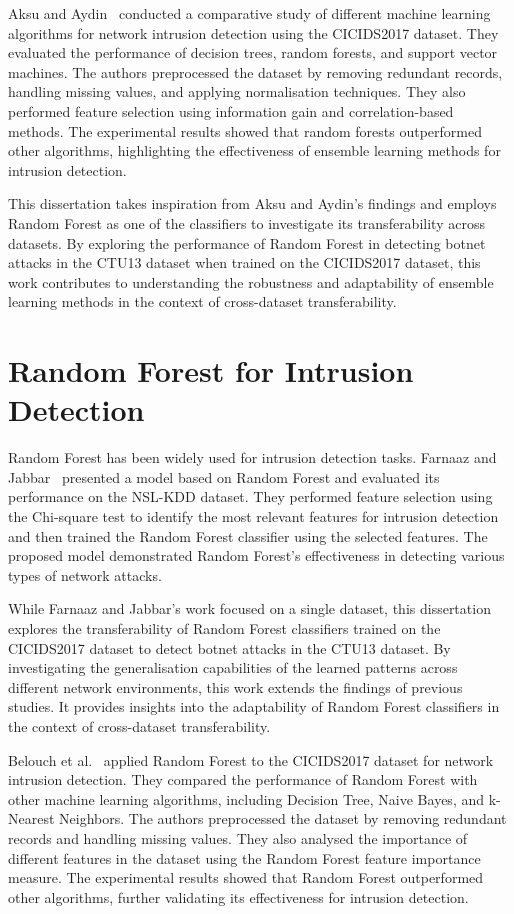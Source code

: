 Aksu and Aydin~\cite{aksu2018detecting} conducted a comparative study of different machine learning algorithms for network intrusion detection using the CICIDS2017 dataset. They evaluated the performance of decision trees, random forests, and support vector machines. The authors preprocessed the dataset by removing redundant records, handling missing values, and applying normalisation techniques. They also performed feature selection using information gain and correlation-based methods. The experimental results showed that random forests outperformed other algorithms, highlighting the effectiveness of ensemble learning methods for intrusion detection.

This dissertation takes inspiration from Aksu and Aydin’s findings and employs Random Forest as one of the classifiers to investigate its transferability across datasets. By exploring the performance of Random Forest in detecting botnet attacks in the CTU13 dataset when trained on the CICIDS2017 dataset, this work contributes to understanding the robustness and adaptability of ensemble learning methods in the context of cross-dataset transferability.

\section{Random Forest for Intrusion Detection}

Random Forest has been widely used for intrusion detection tasks. Farnaaz and Jabbar~\cite{farnaaz2016random} presented a model based on Random Forest and evaluated its performance on the NSL-KDD dataset. They performed feature selection using the Chi-square test to identify the most relevant features for intrusion detection and then trained the Random Forest classifier using the selected features. The proposed model demonstrated Random Forest’s effectiveness in detecting various types of network attacks.

While Farnaaz and Jabbar’s work focused on a single dataset, this dissertation explores the transferability of Random Forest classifiers trained on the CICIDS2017 dataset to detect botnet attacks in the CTU13 dataset. By investigating the generalisation capabilities of the learned patterns across different network environments, this work extends the findings of previous studies. It provides insights into the adaptability of Random Forest classifiers in the context of cross-dataset transferability.

Belouch et al.~\cite{belouch2018performance} applied Random Forest to the CICIDS2017 dataset for network intrusion detection. They compared the performance of Random Forest with other machine learning algorithms, including Decision Tree, Naive Bayes, and k-Nearest Neighbors. The authors preprocessed the dataset by removing redundant records and handling missing values. They also analysed the importance of different features in the dataset using the Random Forest feature importance measure. The experimental results showed that Random Forest outperformed other algorithms, further validating its effectiveness for intrusion detection.


